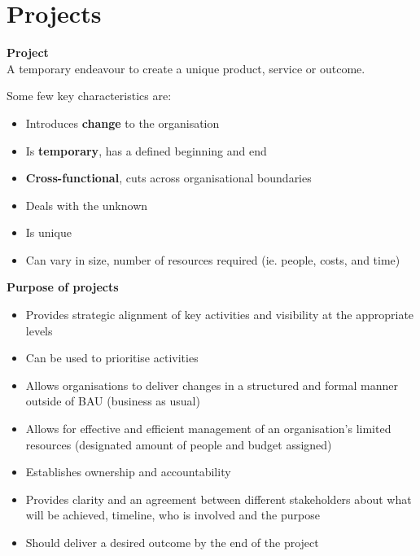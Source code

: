 \documentclass[a4paper,10pt]{article}
\begin{document}
\section*{Projects}
\begin{shaded}
	\noindent \textcolor{Emerald}{\textbf{Project}} \\
	A temporary endeavour to create a unique product, service or outcome. 
\end{shaded}
Some few key characteristics are:
\begin{itemize}
	\item Introduces \textbf{change} to the organisation 
	\item Is \textbf{temporary}, has a defined beginning and end 
	\item \textbf{Cross-functional}, cuts across organisational boundaries 
	\item Deals with the unknown
	\item Is unique 
	\item Can vary in size, number of resources required (ie. people, costs, and time)
\end{itemize}
\textcolor{BlueGreen}{\textbf{Purpose of projects}}
\begin{itemize}
	\item Provides strategic alignment of key activities and visibility at the appropriate levels 
	\item Can be used to prioritise activities
	\item Allows organisations to deliver changes in a structured and formal manner outside of BAU (business as usual)
	\item Allows for effective and efficient management of an organisation's limited resources (designated amount of people and budget assigned)
	\item Establishes ownership and accountability 
	\item Provides clarity and an agreement between different stakeholders about what will be achieved, timeline, who is involved and the purpose
	\item Should deliver a desired outcome by the end of the project
\end{itemize}
\end{document}
